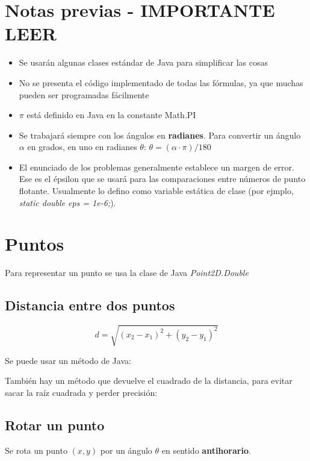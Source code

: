 \documentclass{article}
\begin{document}
\begin{multicols}{2}

\tableofcontents

\section{Notas previas - IMPORTANTE LEER}
\begin{itemize}
	\item Se usarán algunas clases estándar de Java para simplificar las cosas
	\item No se presenta el código implementado de todas las fórmulas, ya que muchas pueden ser programadas fácilmente
	\item \( \pi \) está definido en Java en la constante Math.PI
	\item Se trabajará siempre con los ángulos en {\bf radianes}. Para convertir un ángulo \( \alpha \) en grados, en uno en radianes \( \theta \): \( \theta = (\alpha \cdot \pi) / 180 \)
	\item  El enunciado de los problemas generalmente establece un margen de error. Ese es el épsilon que se usará para las comparaciones entre números de punto flotante. Usualmente lo defino como variable estática de clase (por ejmplo, \emph{static double eps = 1e-6;}).
\end{itemize}


\section{Puntos}
Para representar un punto se usa la clase de Java \emph{Point2D.Double}


\subsection{Distancia entre dos puntos}
\[ d = \sqrt{(x_2-x_1)^{2} + (y_2-y_1)^{2}} \]

Se puede usar un método de Java:


También hay un método que devuelve el cuadrado de la distancia, para evitar sacar la raíz cuadrada y perder precisión:


\subsection{Rotar un punto}
Se rota un punto \( (x, y) \) por un ángulo \( \theta \) en sentido {\bf antihorario}.



\end{multicols}
\end{document}
